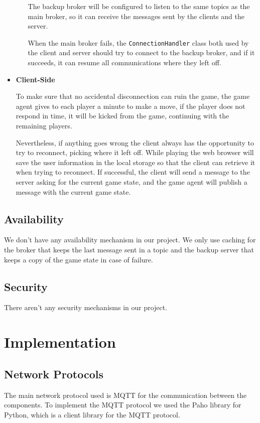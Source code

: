 \documentclass{scrartcl}
\begin{document}
\begin{itemize}
\begin{itemize}
                        The backup broker will be configured to listen to the same topics as the
                        main broker, so it can receive the messages sent by the clients and the server.

                        When the main broker fails, the \texttt{ConnectionHandler} class both used
                        by the client and server should try to connect to the backup broker,
                        and if it succeeds, it can resume all communications where they left off.
            \end{itemize}
      \item
            \textbf{Client-Side} \par
            To make sure that no accidental disconnection can ruin the game, the game agent gives to
            each player a minute to make a move, if the player does not respond in time, it will be
            kicked from the game, continuing with the remaining players.

            Nevertheless, if anything goes wrong the client always has the opportunity to try to
            reconnect, picking where it left off. While playing the web browser will save the user
            information in the local storage so that the client can retrieve it when trying to reconnect.
            If successful, the client will send a message to the server asking for the current game
            state, and the game agent will publish a message with the current game state.
\end{itemize}

\subsection{Availability}\label{availability}
We don't have any availability mechanism in our project.
We only use caching for the broker that keeps the last message sent in a topic
and the backup server that keeps a copy of the game state in case of failure.

\subsection{Security}\label{security}
There aren't any security mechanisms in our project.

\newpage
\section{Implementation}\label{implementation}
\subsection{Network Protocols}\label{network-protocols}
The main network protocol used is MQTT for the communication between the components.
To implement the MQTT protocol we used the Paho library for Python, which is a client library for 
the MQTT protocol.
\end{document}
